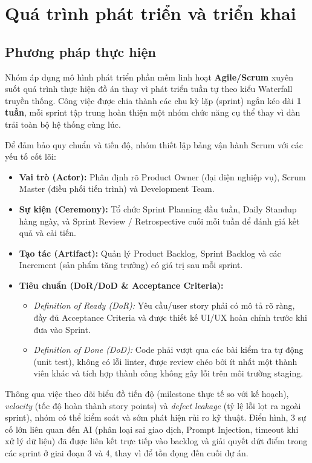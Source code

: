 \chapter{Quá trình phát triển và triển khai}
\label{ch:phat-trien-trien-khai}

\section{Phương pháp thực hiện}
Nhóm áp dụng mô hình phát triển phần mềm linh hoạt \textbf{Agile/Scrum} xuyên suốt quá trình thực hiện đồ án thay vì phát triển tuần tự theo kiểu Waterfall truyền thống. Công việc được chia thành các chu kỳ lặp (sprint) ngắn kéo dài \textbf{1 tuần}, mỗi sprint tập trung hoàn thiện một nhóm chức năng cụ thể thay vì dàn trải toàn bộ hệ thống cùng lúc.

Để đảm bảo quy chuẩn và tiến độ, nhóm thiết lập bảng vận hành Scrum với các yếu tố cốt lõi:
\begin{itemize}
    \item \textbf{Vai trò (Actor):} Phân định rõ Product Owner (đại diện nghiệp vụ), Scrum Master (điều phối tiến trình) và Development Team.
    \item \textbf{Sự kiện (Ceremony):} Tổ chức Sprint Planning đầu tuần, Daily Standup hàng ngày, và Sprint Review / Retrospective cuối mỗi tuần để đánh giá kết quả và cải tiến.
    \item \textbf{Tạo tác (Artifact):} Quản lý Product Backlog, Sprint Backlog và các Increment (sản phẩm tăng trưởng) có giá trị sau mỗi sprint.
    \item \textbf{Tiêu chuẩn (DoR/DoD \& Acceptance Criteria):} 
    \begin{itemize}
        \item \textit{Definition of Ready (DoR):} Yêu cầu/user story phải có mô tả rõ ràng, đầy đủ Acceptance Criteria và được thiết kế UI/UX hoàn chỉnh trước khi đưa vào Sprint.
        \item \textit{Definition of Done (DoD):} Code phải vượt qua các bài kiểm tra tự động (unit test), không có lỗi linter, được review chéo bởi ít nhất một thành viên khác và tích hợp thành công không gây lỗi trên môi trường staging.
    \end{itemize}
\end{itemize}

Thông qua việc theo dõi biểu đồ tiến độ (milestone thực tế so với kế hoạch), \textit{velocity} (tốc độ hoàn thành story points) và \textit{defect leakage} (tỷ lệ lỗi lọt ra ngoài sprint), nhóm có thể kiểm soát và sớm phát hiện rủi ro kỹ thuật. Điển hình, 3 sự cố lớn liên quan đến AI (phân loại sai giao dịch, Prompt Injection, timeout khi xử lý dữ liệu) đã được liên kết trực tiếp vào backlog và giải quyết dứt điểm trong các sprint ở giai đoạn 3 và 4, thay vì để tồn đọng đến cuối dự án.

